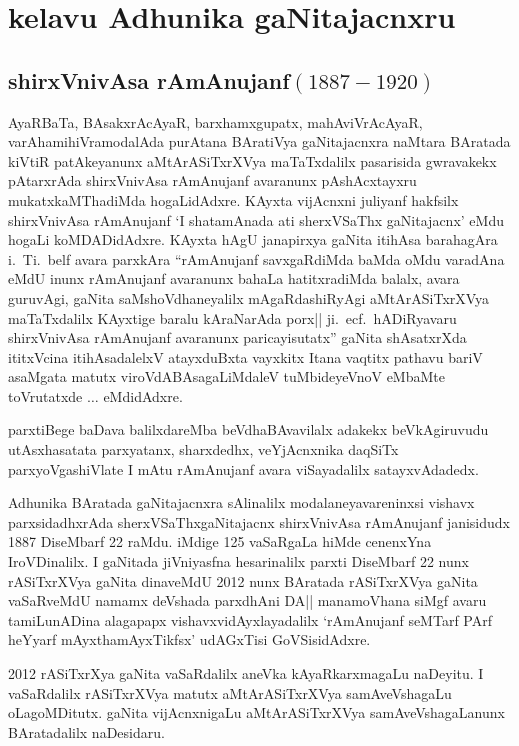 \chapter{kelavu Adhunika gaNitajacnxru}

\section{{\protect\bf shirxVnivAsa rAmAnujanf$(1887-1920)$}}


AyaRBaTa, BAsakxrAcAyaR, barxhamxgupatx, mahAviVrAcAyaR, varAha\-mihiVra\break modalAda purAtana BAratiVya gaNitajacnxra naMtara BAratada kiVtiR patAkeyanunx aMtA\-rASiTxrXVya maTaTxdalilx pasarisida gwravakekx pAtarxrAda shirxVnivAsa rAmAnujanf avaranunx pAshAcxtayxru mukatxkaMThadiMda hogaLidAdxre. KAyxta vijAcnxni juliyanf hakfsilx shirxVnivAsa rAmAnujanf `I shatamAnada ati sherxVSaThx gaNitajacnx' eMdu hogaLi koMDADidAdxre. KAyxta hAgU janapirxya gaNita itihAsa barahagAra i.~Ti.~belf avara parxkAra ``rAmAnu\-janf savxgaRdiMda baMda oMdu varadAna eMdU inunx rAmAnujanf avaranunx bahaLa hatitxradiMda balalx, avara guruvAgi, gaNita saMshoVdhaneyalilx mAgaRdashiRyAgi aMtArASiTxrXVya maTaTxdalilx KAyxtige baralu kAraNarAda porx|| ji.~ecf.~hADiRyavaru shirxVnivAsa rAmAnujanf avaranunx paricayisutatx'' gaNita shAsatxrXda ititxVcina itihAsadalelxV atayxduBxta vayxkitx Itana vaqtitx pathavu bariV asaMgata matutx viroVdABAsagaLiMdaleV tuMbideyeVnoV eMbaMte toVrutatxde $\ldots$ eMdidAdxre.

parxtiBege baDava balilxdareMba beVdhaBAvavilalx adakekx beVkAgiruvudu utAsxha\break satata parxyatanx, sharxdedhx, veYjAcnxnika daqSiTx parxyoVgashiVlate I mAtu rAmAnujanf avara viSayadalilx satayxvAdadedx.

Adhunika BAratada gaNitajacnxra sAlinalilx modalaneyavareninxsi vishavx parxsidadhxrAda sherxVSaThxgaNitajacnx shirxVnivAsa rAmAnujanf janisidudx {\rm 1887} DiseMbarf {\rm 22} raMdu. iMdige {\rm 125} vaSaRgaLa hiMde cenenxYna IroVDinalilx. I gaNitada jiVniyasfna hesarinalilx parxti DiseM\-barf {\rm 22} nunx rASiTxrXVya gaNita dinaveMdU {\rm 2012} nunx BAratada rASiTxrXVya gaNita vaSaR\-veMdU namamx deVshada parxdhAni DA|| manamoVhana siMgf avaru tamiLunADina alagapapx vishavxvidAyxlayadalilx `rAmAnujanf seMTarf PArf heYyarf mAyxthamAyxTikfsx' udAGxTisi GoVSisidAdxre.

{\rm 2012} rASiTxrXya gaNita vaSaRdalilx aneVka kAyaRkarxmagaLu naDeyitu. I vaSaRdalilx rASiTxrXVya matutx aMtArASiTxrXVya samAveVshagaLu oLagoMDitutx. gaNita vijAcnxnigaLu aMtArASiTxrXVya samAveVshagaLanunx BAratadalilx naDesidaru.

